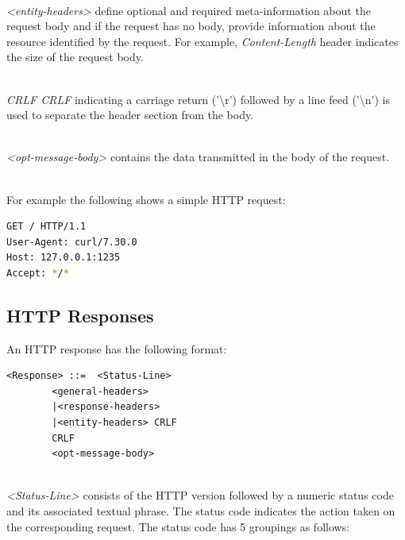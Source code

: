 \documentclass[a4paper,11pt,twoside]{article}
\begin{document}
\noindent\\
\textit{<entity-headers>} define optional and required meta-information about the request body and if the request has no body, provide information about the resource identified by the request. For example, \textit{Content-Length} header indicates the size of the request body. 

\noindent\\
\textit{CRLF CRLF} indicating a carriage return ('\textbackslash r') followed by a line feed ('\textbackslash n') is used to separate the header section from the body.

\noindent\\
\textit{<opt-message-body>} contains the data transmitted in the body of the request.

\noindent\\
For example the following shows a simple HTTP request:

\begin{lstlisting}[language=bash,xleftmargin=.25in,  xrightmargin=.25in]
GET / HTTP/1.1
User-Agent: curl/7.30.0
Host: 127.0.0.1:1235
Accept: */*
\end{lstlisting} 

\subsection{HTTP Responses}
An HTTP response has the following format:\bigskip

\begin{lstlisting}[language=terminal, xleftmargin=.3in,xrightmargin=3.25in]
<Response> ::=	<Status-Line>
		<general-headers>
		|<response-headers>
		|<entity-headers> CRLF
		CRLF 
		<opt-message-body>
\end{lstlisting} 
\noindent\\
\textit{<Status-Line>} consists of the HTTP version followed by a numeric status code and its associated textual phrase. The status code indicates the action taken on the corresponding request.  The status code has 5 groupings as follows:
\end{document}
